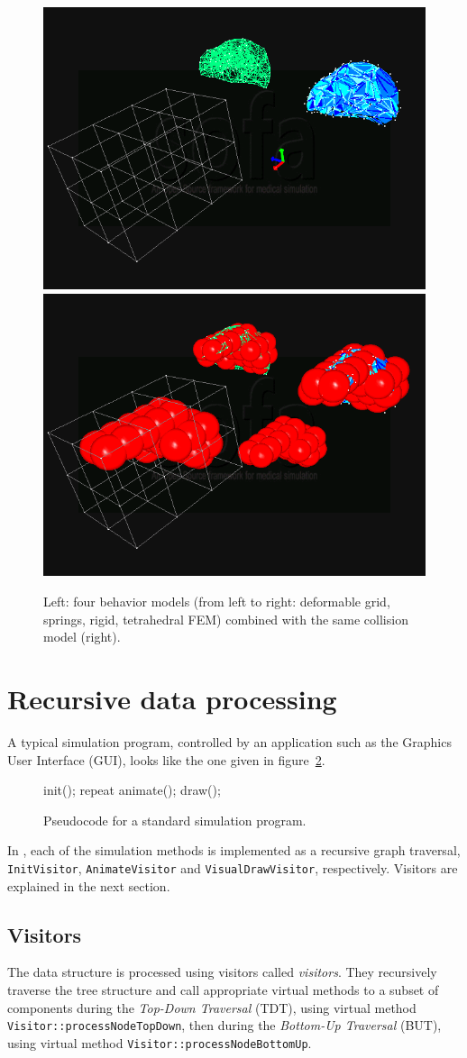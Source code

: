 \begin{figure}
 \centering
 \includegraphics[width=0.4\linewidth]{demoLiverFall1.png}
 \includegraphics[width=0.4\linewidth]{demoLiverFall2.png}
 \caption{Left: four behavior models (from left to right: deformable grid, springs, rigid, tetrahedral FEM) combined with the same collision model (right).}
 \label{fig:behaviormodels}
\end{figure}


\section{Recursive data processing}
A typical simulation program, controlled by an application such as the Graphics User Interface (GUI), looks like the one given in figure~\ref{pc:animationloop}.
\begin{figure}
\begin{code_cpp}
init();
repeat {
	animate();
	draw();
}
\end{code_cpp}
\caption{Pseudocode for a standard simulation program.}
\label{pc:animationloop}
\end{figure}
In \sofa, each of the simulation methods is implemented as a recursive graph traversal, \texttt{InitVisitor}, \texttt{AnimateVisitor} and \texttt{VisualDrawVisitor}, respectively. Visitors are explained in the next section.

\subsection{Visitors}
The data structure is processed using visitors called \emph{visitors}. 
They recursively traverse the tree structure and call appropriate virtual methods to a subset of components during the \textit{Top-Down Traversal} (TDT), using virtual method \texttt{Visitor::processNodeTopDown}, then during the \textit{Bottom-Up Traversal} (BUT), using virtual method \texttt{Visitor::processNodeBottomUp}. 

